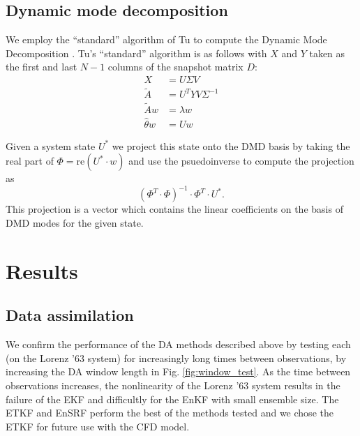 \documentclass[pre,twocolumn,twoside,byrevtex,superscriptaddress]{revtex4}
\begin{document}
\subsection*{Dynamic mode decomposition}

We employ the ``standard'' algorithm of Tu to compute the Dynamic Mode Decomposition \cite{tu2013dynamic}.
Tu's ``standard'' algorithm is as follows with $X$ and $Y$ taken as the first and last $N-1$ columns of the snapshot matrix $D$:
\begin{align*} X &= U\Sigma V \tag*{(Take SVD of $X$.)}\\
  \tilde{A} &= U^T Y V \Sigma ^{-1} \tag*{(Build the $A$ matrix.)}\\
  \tilde{A}w &= \lambda w \tag*{(Compute eigenvectors and values.)}\\
  \hat{\theta}w &= U w \tag*{(Compute corresponding modes.)}\end{align*}

Given a system state $U^*$ we project this state onto the DMD basis by taking the real part of $\Phi = \text{re}\left (U^*\cdot w\right)$ and use the psuedoinverse to compute the projection as $$(\Phi^T \cdot \Phi)^{-1} \cdot \Phi ^T \cdot U^*.$$
This projection is a vector which contains the linear coefficients on the basis of DMD modes for the given state.

\section*{Results}

\subsection*{Data assimilation}
\label{data_assimilation_section}

We confirm the performance of the DA methods described above by testing each (on the Lorenz '63 system) for increasingly long times between observations, by increasing the DA window length in Fig. \ref{fig:window_test}.
As the time between observations increases, the nonlinearity of the Lorenz '63 system results in the failure of the EKF and difficultly for the EnKF with small ensemble size.
The ETKF and EnSRF perform the best of the methods tested and we chose the ETKF for future use with the CFD model.
\end{document}
